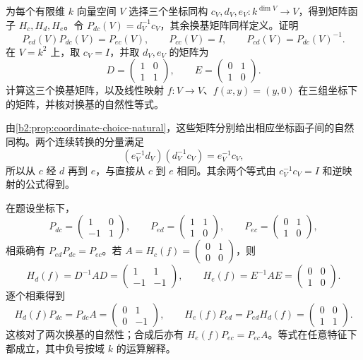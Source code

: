 \begin{exercise}\label{b2:ex:05-coordinate-choice-natural}
	为每个有限维 \(k\) 向量空间 \(V\) 选择三个坐标同构 \(c_V,d_V,e_V:k^{\dim V}\rightarrow V\)，得到矩阵函子 \(H_c,H_d,H_e\)。令 \(P_{dc}(V)=d_V^{-1}c_V\)，其余换基矩阵同样定义。证明
	\[
		P_{ed}(V)P_{dc}(V)=P_{ec}(V),\qquad P_{cc}(V)=I,\qquad P_{cd}(V)=P_{dc}(V)^{-1}.
	\]
	在 \(V=k^2\) 上，取 \(c_V=I\)，并取 \(d_V,e_V\) 的矩阵为
	\[
		D=\begin{pmatrix}1&0\\1&1\end{pmatrix},\qquad
		E=\begin{pmatrix}0&1\\1&0\end{pmatrix}.
	\]
	计算这三个换基矩阵，以及线性映射 \(f:V\rightarrow V\)、\(f(x,y)=(y,0)\) 在三组坐标下的矩阵，并核对换基的自然性等式。
\end{exercise}
\begin{solution}
	由\cref{b2:prop:coordinate-choice-natural}，这些矩阵分别给出相应坐标函子间的自然同构。两个连续转换的分量满足
	\[
		(e_V^{-1}d_V)(d_V^{-1}c_V)=e_V^{-1}c_V,
	\]
	所以从 \(c\) 经 \(d\) 再到 \(e\)，与直接从 \(c\) 到 \(e\) 相同。其余两个等式由 \(c_V^{-1}c_V=I\) 和逆映射的公式得到。

	在题设坐标下，
	\[
		P_{dc}=\begin{pmatrix}1&0\\-1&1\end{pmatrix},\qquad
		P_{ed}=\begin{pmatrix}1&1\\1&0\end{pmatrix},\qquad
		P_{ec}=\begin{pmatrix}0&1\\1&0\end{pmatrix},
	\]
	相乘确有 \(P_{ed}P_{dc}=P_{ec}\)。若 \(A=H_c(f)=\begin{pmatrix}0&1\\0&0\end{pmatrix}\)，则
	\[
		H_d(f)=D^{-1}AD=\begin{pmatrix}1&1\\-1&-1\end{pmatrix},
		\qquad H_e(f)=E^{-1}AE=\begin{pmatrix}0&0\\1&0\end{pmatrix}.
	\]
	逐个相乘得到
	\[
		H_d(f)P_{dc}=P_{dc}A=\begin{pmatrix}0&1\\0&-1\end{pmatrix},
		\qquad
		H_e(f)P_{ed}=P_{ed}H_d(f)=\begin{pmatrix}0&0\\1&1\end{pmatrix}.
	\]
	这核对了两次换基的自然性；合成后亦有 \(H_e(f)P_{ec}=P_{ec}A\)。等式在任意特征下都成立，其中负号按域 \(k\) 的运算解释。
\end{solution}

